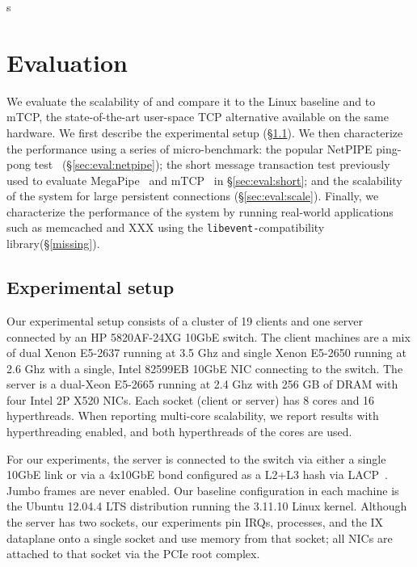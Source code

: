 s
\section{Evaluation}
\label{sec:eval}

We evaluate the scalability of \ix and compare it to the Linux baseline
and to mTCP, the state-of-the-art user-space TCP alternative available
on the same hardware.  We first describe the experimental setup
(\S\ref{sec:eval:setup}).  We then characterize the performance using
a series of micro-benchmark: the popular NetPIPE ping-pong
test~\cite{snell1996netpipe} (\S\ref{sec:eval:netpipe}); the short
message transaction test previously used to evaluate
MegaPipe~\cite{han2012megapipe} and mTCP~\cite{jeong2014mtcp} in
\S\ref{sec:eval:short}; and the scalability of the system for large
persistent connections (\S\ref{sec:eval:scale}).  Finally, we
characterize the performance of the \ix system by running real-world
applications such as memcached and XXX using the
\texttt{libevent-}compatibility library(\S\ref{missing}).


\subsection{Experimental setup}
\label{sec:eval:setup}

Our experimental setup consists of a cluster of 19 clients and one
server connected by an HP 5820AF-24XG 10GbE switch.  The client
machines are a mix of dual Xenon E5-2637 running at 3.5 Ghz and single Xenon E5-2650 running at 2.6 Ghz with a single, Intel
82599EB 10GbE NIC connecting to the switch.  The server is a dual-Xeon E5-2665
running at 2.4 Ghz with 256 GB of DRAM with four Intel 2P X520 NICs.  Each
socket (client or server) has 8 cores and 16 hyperthreads.  When
reporting multi-core scalability, we report results with
hyperthreading enabled, and both hyperthreads of the cores are used.

For our experiments, the server is connected to
the switch via either a single 10GbE link or via a 4x10GbE bond configured as a L2+L3
hash via LACP~\cite{ieee802.3ad}. Jumbo
frames are never enabled.  Our baseline configuration in each machine
is the Ubuntu 12.04.4 LTS distribution running the 3.11.10 Linux kernel.  Although
the server has two sockets, our experiments pin IRQs, processes, and
the IX dataplane onto a single socket and use memory from that socket;
all NICs are attached to that socket via the PCIe root complex. 

